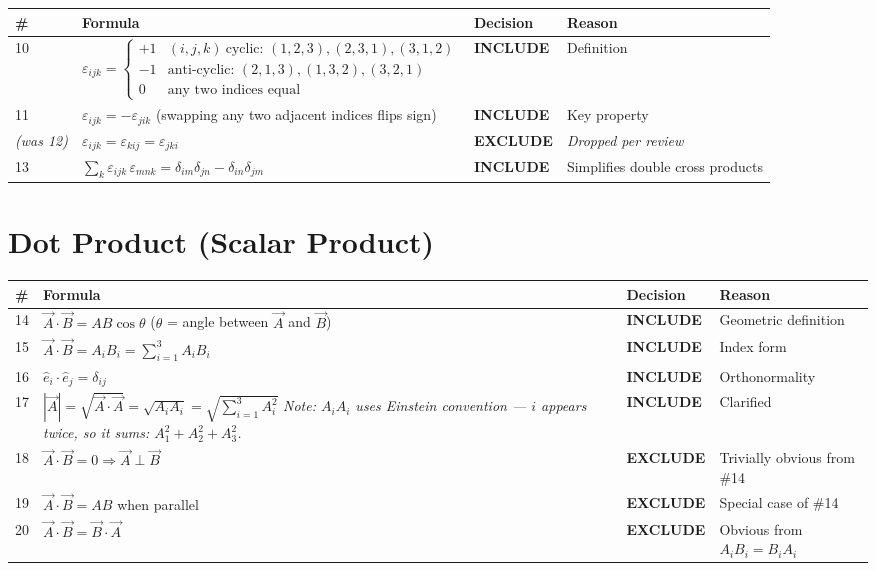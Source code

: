 \documentclass[11pt,a4paper]{article}
\newcommand{\inc}{\textbf{\textcolor{incgreen}{INCLUDE}}}
\newcommand{\exc}{\textbf{\textcolor{exred}{EXCLUDE}}}
\begin{document}
\begin{longtable}{p{0.5cm} p{7.5cm} p{2.2cm} p{3.5cm}}
\toprule
\# & Formula & Decision & Reason \\
\midrule
\endhead
10 & $\displaystyle\varepsilon_{ijk} = \begin{cases} +1 & (i,j,k)\ \text{cyclic: } (1,2,3),(2,3,1),(3,1,2) \\ -1 & \text{anti-cyclic: } (2,1,3),(1,3,2),(3,2,1) \\ 0 & \text{any two indices equal} \end{cases}$ & \inc & Definition \\[26pt]
11 & $\varepsilon_{ijk} = -\varepsilon_{jik}$ \quad (swapping any two adjacent indices flips sign) & \inc & Key property \\[10pt]
\textit{(was 12)} & $\varepsilon_{ijk} = \varepsilon_{kij} = \varepsilon_{jki}$ & \exc & \textit{Dropped per review} \\[10pt]
13 & $\displaystyle\sum_k \varepsilon_{ijk}\,\varepsilon_{mnk} = \delta_{im}\delta_{jn} - \delta_{in}\delta_{jm}$ & \inc & Simplifies double cross products \\[6pt]
\bottomrule
\end{longtable}

\section{Dot Product (Scalar Product)}

\begin{longtable}{p{0.5cm} p{7.5cm} p{2.2cm} p{3.5cm}}
\toprule
\# & Formula & Decision & Reason \\
\midrule
\endhead
14 & $\vec{A}\cdot\vec{B} = AB\cos\theta$ \quad ($\theta$ = angle between $\vec{A}$ and $\vec{B}$) & \inc & Geometric definition \\[10pt]
15 & $\vec{A}\cdot\vec{B} = A_i B_i = \displaystyle\sum_{i=1}^{3} A_i B_i$ & \inc & Index form \\[14pt]
16 & $\hat{e}_i\cdot\hat{e}_j = \delta_{ij}$ & \inc & Orthonormality \\[10pt]
17 & $|\vec{A}| = \sqrt{\vec{A}\cdot\vec{A}} = \sqrt{A_i A_i} = \sqrt{\displaystyle\sum_{i=1}^{3} A_i^2}$\newline
\textit{Note: $A_i A_i$ uses Einstein convention --- $i$ appears twice, so it sums: $A_1^2 + A_2^2 + A_3^2$.}
& \inc & Clarified \\[18pt]
18 & $\vec{A}\cdot\vec{B}=0 \Rightarrow \vec{A}\perp\vec{B}$ & \exc & Trivially obvious from \#14 \\[10pt]
19 & $\vec{A}\cdot\vec{B}=AB$ when parallel & \exc & Special case of \#14 \\[10pt]
20 & $\vec{A}\cdot\vec{B}=\vec{B}\cdot\vec{A}$ & \exc & Obvious from $A_iB_i = B_iA_i$ \\[6pt]
\bottomrule
\end{longtable}
\end{document}
